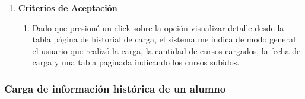 \begin{enumerate}
\begin{enumerate}
			\item \textbf{Criterios de Aceptación}
				\begin{enumerate}
					\item Dado que presioné un click sobre la opción visualizar detalle desde la tabla página de historial de carga, el sistema me indica de modo general el usuario que realizó la carga, la cantidad de cursos cargados, la fecha de carga y una tabla paginada indicando los cursos subidos.
				\end{enumerate}
		\end{enumerate}
\end{enumerate}

\subsubsection{Carga de información histórica de un alumno}

